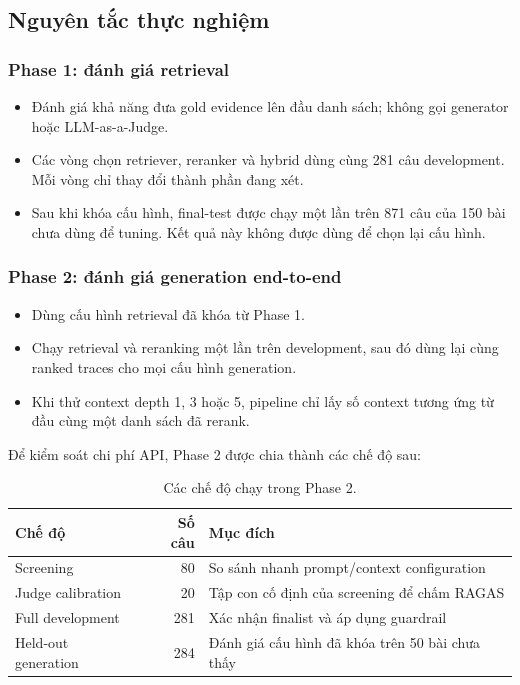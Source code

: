 \subsection{Nguyên tắc thực nghiệm}

\subsubsection{Phase 1: đánh giá retrieval}

\begin{itemize}
  \item Đánh giá khả năng đưa gold evidence lên đầu danh sách; không gọi
  generator hoặc LLM-as-a-Judge.
  \item Các vòng chọn retriever, reranker và hybrid dùng cùng 281 câu
  development. Mỗi vòng chỉ thay đổi thành phần đang xét.
  \item Sau khi khóa cấu hình, final-test được chạy một lần trên 871 câu của 150
  bài chưa dùng để tuning. Kết quả này không được dùng để chọn lại cấu hình.
\end{itemize}

\subsubsection{Phase 2: đánh giá generation end-to-end}

\begin{itemize}
  \item Dùng cấu hình retrieval đã khóa từ Phase 1.
  \item Chạy retrieval và reranking một lần trên development, sau đó dùng lại
  cùng ranked traces cho mọi cấu hình generation.
  \item Khi thử context depth 1, 3 hoặc 5, pipeline chỉ lấy số context tương ứng
  từ đầu cùng một danh sách đã rerank.
\end{itemize}

Để kiểm soát chi phí API, Phase 2 được chia thành các chế độ sau:

\begin{table}[htbp]
  \centering
  \caption{Các chế độ chạy trong Phase 2.}
  \label{tab:phase2-run-modes}
  \begin{tabularx}{\textwidth}{@{}XrX@{}}
    \toprule
    \textbf{Chế độ} & \textbf{Số câu} & \textbf{Mục đích} \\
    \midrule
    Screening & 80 & So sánh nhanh prompt/context configuration \\
    Judge calibration & 20 & Tập con cố định của screening để chấm RAGAS \\
    Full development & 281 & Xác nhận finalist và áp dụng guardrail \\
    Held-out generation & 284 & Đánh giá cấu hình đã khóa trên 50 bài chưa thấy \\
    \bottomrule
  \end{tabularx}
\end{table}

